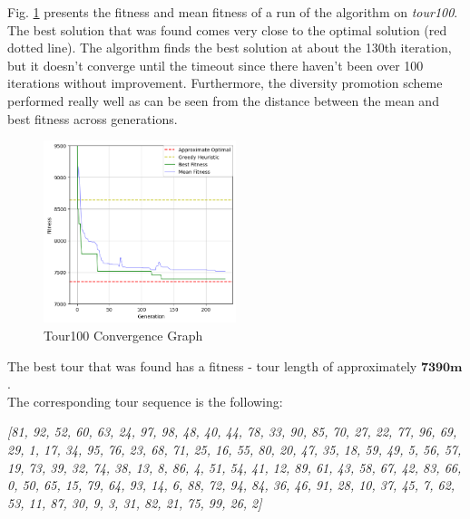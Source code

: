 \documentclass[a4paper,10pt]{article}
\newcommand{\ReplaceMe}[1]{{\color{blue}#1}}
\begin{document}
%
%

Fig. \ref{fig:tour100convergence} presents the fitness and mean fitness of a run of the algorithm on \textit{tour100}. The best solution that was found comes very close to the optimal solution (red dotted line). The algorithm finds the best solution at about the 130th iteration, but it doesn't converge until the timeout since there haven't been over 100 iterations without improvement. Furthermore, the diversity promotion scheme performed really well as can be seen from the distance between the mean and best fitness across generations.

\begin{figure}[H]
    \centering
	\includegraphics[width=0.5\textwidth]{results/4.3/tour100_convergence.png}
    \caption{Tour100 Convergence Graph}
    \label{fig:tour100convergence}
\end{figure}

The best tour that was found has a fitness - tour length of approximately $\textbf{7390m}$.\\
The corresponding tour sequence is the following:\\

\begin{minipage}{\textwidth}
\centering
\textit{[81, 92, 52, 60, 63, 24, 97, 98, 48, 40, 44, 78, 33, 90, 85, 70, 27, 22, 77, 96, 69, 29, 1, 17, 34, 95, 76, 23, 68, 71, 25, 16, 55, 80, 20, 47, 35, 18, 59, 49, 5, 56, 57, 19, 73, 39, 32, 74, 38, 13, 8, 86, 4, 51, 54, 41, 12, 89, 61, 43, 58, 67, 42, 83, 66, 0, 50, 65, 15, 79, 64, 93, 14, 6, 88, 72, 94, 84, 36, 46, 91, 28, 10, 37, 45, 7, 62, 53, 11, 87, 30, 9, 3, 31, 82, 21, 75, 99, 26, 2]}
\end{minipage}
\end{document}
